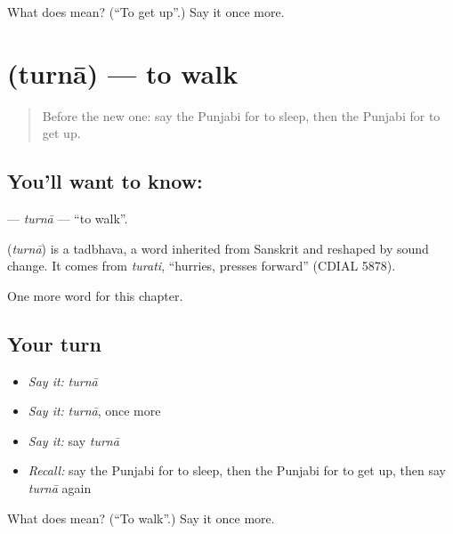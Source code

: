 \begin{tcolorbox}[breakable,colback=teal!4,colframe=teal!35!black,title={Before you move on}]
What does  mean? (\textquotedblleft{}To get up\textquotedblright{}.) Say it once more.
\end{tcolorbox}
\section[\texorpdfstring{\pa{ਤੁਰਨਾ} (turnā)}{ਤੁਰਨਾ (turnā)}]{ (turnā) — to walk}

\label{lesson:PA-C57-turna}



\begin{quote}
Before the new one: say the Punjabi for to sleep, then the Punjabi for to get up.
\end{quote}

\subsection*{You'll want to know: }
\textbf{} — \emph{turnā} — \textquotedblleft{}to walk\textquotedblright{}.

\begin{cousinweb}
\textbf{} (\emph{turnā}) is a tadbhava, a word inherited from Sanskrit and reshaped by sound change. It comes from \emph{turati}, \textquotedblleft{}hurries, presses forward\textquotedblright{} (CDIAL 5878).
\end{cousinweb}

\begin{grammarlens}[title={What you've built}]
One more word for this chapter.
\end{grammarlens}

\subsection*{Your turn}
\begin{itemize}
\raggedright
  \item \emph{Say it:} \emph{turnā}
  \item \emph{Say it:} \emph{turnā}, once more
  \item \emph{Say it:} say \emph{turnā}
  \item \emph{Recall:} say the Punjabi for to sleep, then the Punjabi for to get up, then say \emph{turnā} again
\end{itemize}

\begin{tcolorbox}[breakable,colback=teal!4,colframe=teal!35!black,title={Before you move on}]
What does  mean? (\textquotedblleft{}To walk\textquotedblright{}.) Say it once more.
\end{tcolorbox}
